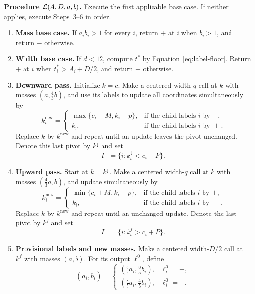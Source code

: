\medskip
\noindent\textbf{Procedure $\mathcal L(A,D,a,b)$.}
Execute the first applicable base case.  If neither applies, execute
Steps~3--6 in order.
\begin{enumerate}
\item \textbf{Mass base case.}
If $a_i b_i>1$ for every $i$, return $+$ at $i$ when $b_i>1$,
and return $-$ otherwise.

\item \textbf{Width base case.}
If $d<12$, compute $t^*$ by Equation~\eqref{eq:label-floor}.
Return $+$ at $i$ when $t_i^*>A_i+D/2$, and return $-$ otherwise.

\item \textbf{Downward pass.}
Initialize $k=c$.  Make a centered width-$q$ call at $k$ with
masses $(a,\frac43 b)$, and use its labels to update all coordinates
simultaneously by
\begin{equation}
 k_i^{\mathrm{new}}=
 \begin{cases}
  \max\{c_i-M,k_i-p\},&\text{if the child labels }i\text{ by }-,\\
  k_i,&\text{if the child labels }i\text{ by }+.
 \end{cases}
 \label{eq:label-down-update}
\end{equation}
Replace $k$ by $k^{\mathrm{new}}$ and repeat until an update leaves
the pivot unchanged.  Denote this last pivot by $k^{\downarrow}$ and set
\begin{equation}
 I_- =\{i:k_i^{\downarrow}<c_i-P\}.
 \label{eq:label-minus-override}
\end{equation}

\item \textbf{Upward pass.}
Start at $k=k^{\downarrow}$.  Make a centered width-$q$ call at $k$
with masses $(\frac43 a,b)$, and update simultaneously by
\begin{equation}
 k_i^{\mathrm{new}}=
 \begin{cases}
  \min\{c_i+M,k_i+p\},&\text{if the child labels }i\text{ by }+,\\
  k_i,&\text{if the child labels }i\text{ by }-.
 \end{cases}
 \label{eq:label-up-update}
\end{equation}
Replace $k$ by $k^{\mathrm{new}}$ and repeat until an unchanged
update.  Denote the last pivot by $k^f$ and set
\begin{equation}
 I_+ =\{i:k_i^f>c_i+P\}.
 \label{eq:label-plus-override}
\end{equation}

\item \textbf{Provisional labels and new masses.}
Make a centered width-$D/2$ call at $k^f$ with masses $(a,b)$.
For its output $\ell^0$, define
\begin{equation}
 (\bar a_i,\bar b_i)=
 \begin{cases}
  (\frac45 a_i,\frac85 b_i),&\ell_i^0=+,\\[1mm]
  (\frac85 a_i,\frac45 b_i),&\ell_i^0=-.
 \end{cases}
 \label{eq:label-reweight}
\end{equation}


\end{enumerate}
